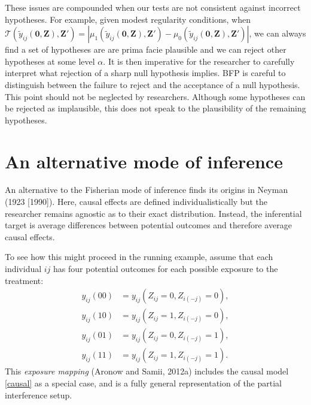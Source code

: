 \documentclass[12pt]{article}
\newcommand{\Z}{\mathbf{Z}}
\newcommand{\T}{\mathcal{T}}
\newcommand{\0}{\mathbf{0}}
\begin{document}
These issues are compounded when our tests are not consistent against incorrect hypotheses. For example, given modest regularity conditions, when $\T(\widetilde y_{ij}(\0,\Z), \Z') = 
\left\vert \mu_1 ( \widetilde y_{ij}(\0,\Z), \Z' ) - \mu_0 ( \widetilde y_{ij}(\0,\Z), \Z' )
\right\vert
$, we can always find a set of hypotheses are are prima facie plausible and we can reject other hypotheses at some level $\alpha$. It is then imperative for the researcher to carefully interpret what rejection of a sharp null hypothesis implies. BFP is careful to distinguish between the failure to reject and  the acceptance of a null hypothesis. This point should not be neglected by researchers. Although some hypotheses can be rejected as implausible, this does not speak to the plausibility of the remaining hypotheses. 

\section*{An alternative mode of inference}

An alternative to the Fisherian mode of inference finds its origins in Neyman (1923 [1990]).  Here, causal effects are defined individualistically but the researcher remains agnostic as to their exact distribution. Instead, the inferential target is average differences between potential outcomes and therefore average causal effects.

To see how this might proceed in the running example, assume that each individual $ij$ has four potential outcomes for each possible exposure to the treatment:
\begin{align*}
y_{ij}(00) &= y_{ij}(Z_{ij} = 0, Z_{i(-j)} = 0), \\
y_{ij}(10) &= y_{ij}(Z_{ij} = 1, Z_{i(-j)} = 0), \\
y_{ij}(01) &= y_{ij}(Z_{ij} = 0, Z_{i(-j)} = 1), \\
y_{ij}(11) &= y_{ij}(Z_{ij} = 1, Z_{i(-j)} = 1).
\end{align*}
This {\it exposure mapping} (Aronow and Samii, 2012a) includes the causal model \eqref{causal} as a special case, and is a fully general representation of the partial interference setup. 
\end{document}
